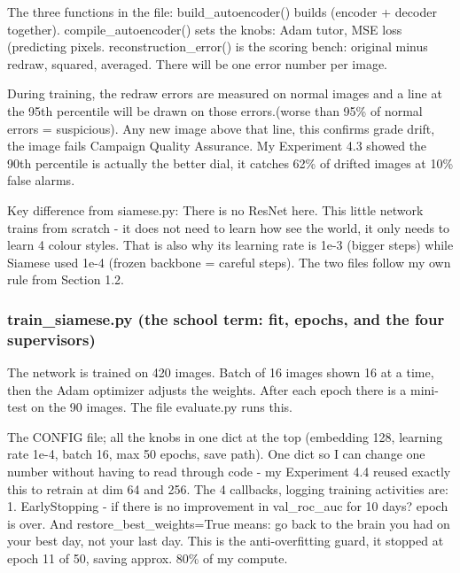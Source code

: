 \documentclass[conference]{IEEEtran}
\begin{document}
The three functions in the file: build\_autoencoder() builds (encoder + decoder together). compile\_autoencoder() sets the knobs: Adam tutor, MSE loss (predicting pixels. reconstruction\_error() is the scoring bench: original minus redraw, squared, averaged. There will be one error number per image.

During training, the redraw errors are measured on normal images and a line at the 95th percentile will be drawn on those errors.(worse than 95\% of normal errors = suspicious). Any new image above that line, this confirms grade drift, the image fails Campaign Quality Assurance. My Experiment 4.3 showed the 90th percentile is actually the better dial, it catches 62\% of drifted images at 10\% false alarms.

Key difference from siamese.py: There is no ResNet here. This little network trains from scratch - it does not need to learn how see the world, it only needs to learn 4 colour styles. That is also why its learning rate is 1e-3 (bigger steps) while Siamese used 1e-4 (frozen backbone = careful steps). The two files follow my own rule from Section 1.2.

\subsubsection{train\_siamese.py (the school term: fit, epochs, and the four supervisors)}

The network is trained on 420 images. Batch of 16 images shown 16 at a time, then the Adam optimizer adjusts the weights. After each epoch there is a mini-test on the 90 images. The file evaluate.py runs this.

The CONFIG file; all the knobs in one dict at the top (embedding 128, learning rate 1e-4, batch 16, max 50 epochs, save path). One dict so I can change one number without having to read through code - my Experiment 4.4 reused exactly this to retrain at dim 64 and 256.
The 4 callbacks, logging training activities are:
1. EarlyStopping - if there is no improvement in val\_roc\_auc for 10 days? epoch is over. And restore\_best\_weights=True means: go back to the brain you had on your best day, not your last day. This is the anti-overfitting guard, it stopped at epoch 11 of 50, saving approx. 80\% of my compute.
\end{document}
